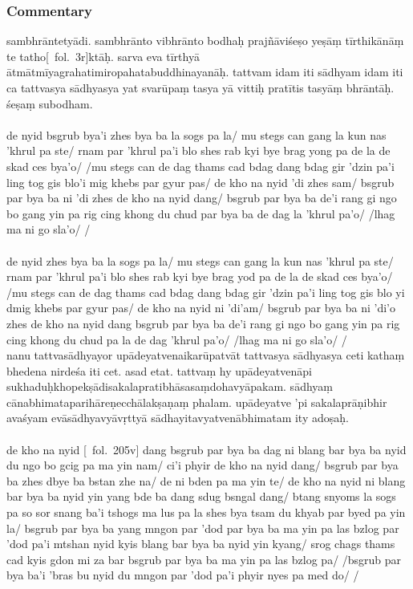 \documentclass[12pt]{article}
\begin{document}
\subsubsection{Commentary}
sambhrāntetyādi.
sambhrānto vibhrānto bodhaḥ prajñāviśeṣo yeṣāṃ tīrthikānāṃ te tatho[\MS\ fol.\ 3r]ktāḥ.\footnoteB{
	te tathoktāḥ]; \MS\PCreading ; te thoktāḥ \MS\ACreading ; tathoktāḥ \EDD
}
sarva eva tīrthyā ātmātmīyagrahatimiropahatabuddhinayanāḥ.
tattvam idam iti sādhyam idam\footnoteB{
	sādhyam idam] \emd ; sādhyaṃ cedam \MS\ \EDD
} iti ca tattvasya sādhyasya yat\footnoteB{
	yat] \EDD\ (\emd); tat \MS
} svarūpaṃ tasya yā vittiḥ pratītis tasyāṃ bhrāntāḥ.
śeṣaṃ subodham.\\

\textbf{\TVA}\\
de nyid bsgrub bya'i zhes bya ba la sogs pa la/ mu stegs can gang la kun nas 'khrul pa ste/ rnam par 'khrul pa'i blo shes rab kyi bye brag yong pa de la de skad ces bya'o/ /mu stegs can de dag thams cad bdag dang bdag gir 'dzin pa'i ling tog gis blo'i mig khebs par gyur pas/ de kho na nyid 'di zhes sam/ bsgrub par bya ba ni 'di zhes de kho na nyid dang/ bsgrub par bya ba de'i rang gi ngo bo gang yin pa rig cing khong du chud par bya ba de dag la 'khrul pa'o/ /lhag ma ni go sla'o/ /\\

\textbf{\TVB}\\
de nyid zhes bya ba la sogs pa la/ mu stegs can gang la kun nas 'khrul pa ste/ rnam par 'khrul pa'i blo shes rab kyi bye brag yod pa de la de skad ces bya'o/ /mu stegs can de dag thams cad bdag dang bdag gir 'dzin pa'i ling tog gis blo yi dmig khebs par gyur pas/ de kho na nyid ni 'di'am/ bsgrub par bya ba ni 'di'o zhes de kho na nyid dang bsgrub par bya ba de'i rang gi ngo bo gang yin pa rig cing khong du chud pa la de dag 'khrul pa'o/ /lhag ma ni go sla'o/ /\\

nanu tattvasādhyayor upādeyatvenaikarūpatvāt tattvasya sādhyasya ceti kathaṃ\footnoteB{
	tattvasya sādhyasya ceti kathaṃ] \EDD\ (\emd); tat kathaṃ tatvasya sādhyasya ceti \MS
} bhedena nirdeśa iti cet.
asad etat.
tattvaṃ hy upādeyatvenāpi sukhaduḥkhopekṣādisakalapratibhāsasaṃdohavyāpakam.
sādhyaṃ cānabhimataparihāreṇecchālakṣaṇaṃ phalam.
upādeyatve 'pi sakalaprāṇibhir avaśyam evāsādhyavyāvṛttyā sādhayitavyatvenābhimatam ity adoṣaḥ.\\

\textbf{\TVA}\\
de kho na nyid [\TVA\ fol.\ 205v] dang bsgrub par bya ba dag ni blang bar bya ba nyid du ngo bo gcig pa ma yin nam/ ci'i phyir de kho na nyid dang/ bsgrub par bya ba zhes dbye ba bstan zhe na/ de ni bden pa ma yin te/ de kho na nyid ni blang bar bya ba nyid yin yang bde ba dang sdug bsngal dang/ btang snyoms la sogs pa so sor snang ba'i tshogs ma lus pa la shes bya tsam du khyab par byed pa yin la/ bsgrub par bya ba yang mngon par 'dod par bya ba ma yin pa las bzlog par 'dod pa'i mtshan nyid kyis blang bar bya ba nyid yin kyang/ srog chags thams cad kyis gdon mi za bar bsgrub par bya ba ma yin pa las bzlog pa/ /bsgrub par bya ba'i 'bras bu nyid du mngon par 'dod pa'i phyir nyes pa med do/ /\\
\end{document}
